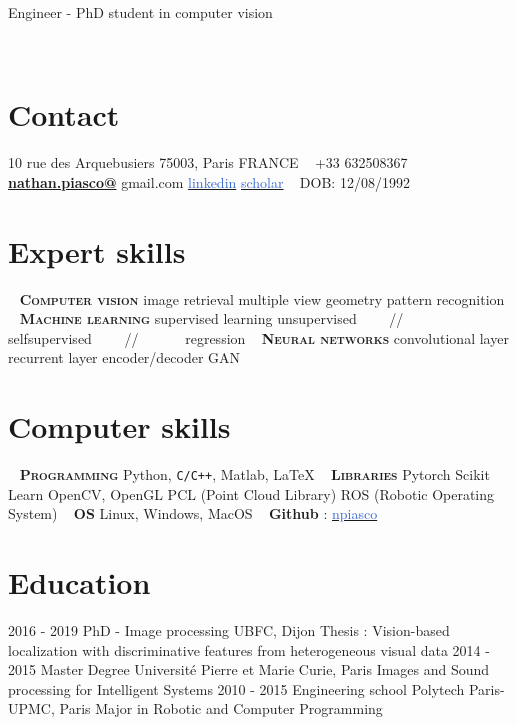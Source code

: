 \documentclass[]{friggeri-cv-cust}
\begin{document}
      {Engineer - PhD student in computer vision}
      
\vspace{10pt}
\vspace{1pt}

\begin{aside}
  ~
  \section{Contact}
    10 rue des Arquebusiers
    75003, Paris
    FRANCE
    ~
    +33 632508367
    ~
   	\href{mailto:nathan.piasco@gmail.com}{\textbf{nathan.piasco@}}
   	gmail.com
	{\href{https://www.linkedin.com/in/nathan-piasco-a4766aa5/}{\textcolor{highlight}{linkedin}}}
	{\href{https://scholar.google.fr/citations?user=S3zYmOYAAAAJ&hl=fr}{\textcolor{highlight}{scholar}}}
	~
    DOB: 12/08/1992
  \section{Expert skills}
    ~
    \textbf{\small{\textsc{Computer vision}}}
    image retrieval
    multiple view geometry
    pattern recognition
    ~
    \textbf{\small{\textsc{Machine learning}}}
    supervised learning
    unsupervised ~~~~//~~~~~~
    selfsupervised ~~~~//~~~~~~
    regression
    ~    
    \textbf{\small{\textsc{Neural networks}}}
    convolutional layer
    recurrent layer
    encoder/decoder
    GAN
  \section{Computer skills}
    ~  
    \textbf{\textsc{\textsc{Programming}}}
    Python, \texttt{C/C++},
    Matlab,  \LaTeX
    ~
    \textbf{\textsc{Libraries}}
    Pytorch
    Scikit Learn
	OpenCV, OpenGL
    PCL (Point Cloud Library)
    ROS (Robotic Operating System)
    ~
    \textbf{\textsc{OS}}
    Linux, Windows, MacOS
    ~
    \textbf{{Github}} : {\href{https://github.com/npiasco}{\textcolor{highlight}{npiasco}}}
\end{aside}

\section{Education}
\begin{entrylist}
  \entry
    {2016 - 2019}
    {PhD - Image processing}
    {UBFC, Dijon}
    {Thesis : Vision-based localization with discriminative features from heterogeneous visual data}
  \entry
    {2014 - 2015}
    {Master Degree}
    {Universit\'e Pierre et Marie Curie, Paris}
    {Images and Sound processing for Intelligent Systems}
  \entry
    {2010 - 2015}
    {Engineering school}
    {Polytech Paris-UPMC, Paris}
    {Major in Robotic and Computer Programming}
\end{entrylist}
\end{document}
